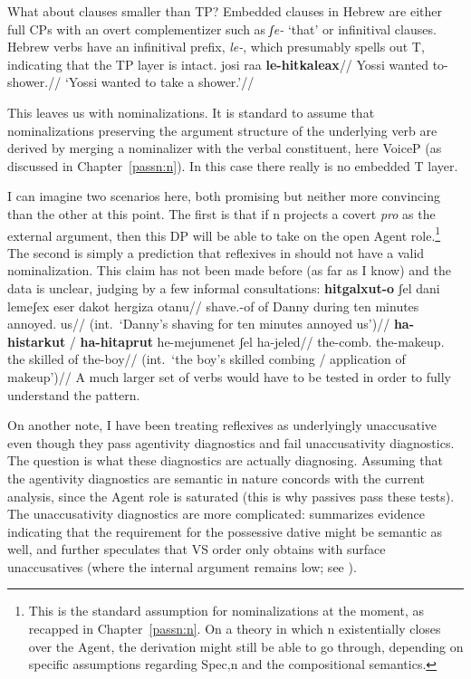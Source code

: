 What about clauses smaller than TP? Embedded clauses in Hebrew are either full CPs with an overt complementizer such as \emph{ʃe-} `that' or infinitival clauses. Hebrew verbs have an infinitival prefix, \emph{le-}, which presumably spells out T, indicating that the TP layer is intact.
\ex
	\begingl
	\gla josi ra{\ts}a \textbf{le-hitkaleax}//
	\glb Yossi wanted to-shower.//
	\glft `Yossi wanted to take a shower.'//
	\endgl
\xe

This leaves us with nominalizations. It is standard to assume that nominalizations preserving the argument structure of the underlying verb are derived by merging a nominalizer with the verbal constituent, here VoiceP (as discussed in Chapter~\ref{passn:n}). In this case there really is no embedded T layer.

I can imagine two scenarios here, both promising but neither more convincing than the other at this point. The first is that if n projects a covert \emph{pro} as the external argument, then this DP will be able to take on the open Agent role.\footnote{This is the standard assumption for nominalizations at the moment, as recapped in Chapter~\ref{passn:n}. On a theory in which n existentially closes over the Agent, the derivation might still be able to go through, depending on specific assumptions regarding Spec,n and the compositional semantics.} The second is simply a prediction that reflexives in {\thit} should not have a valid nominalization. This claim has not been made before (as far as I know) and the data is unclear, judging by a few informal consultations:
\pex
	\a \ljudge{\%} \begingl
		\gla \textbf{hitgalxut-o} ʃel dani lemeʃex eser dakot hergiza otanu//
		\glb shave.-of of Danny during ten minutes annoyed. us//
		\glft (int.~`Danny's shaving for ten minutes annoyed us')//
	\endgl
	\a \ljudge{\%} \begingl
		\gla \textbf{ha-histarkut} / \textbf{ha-hitaprut} he-mejumenet ʃel ha-jeled//
		\glb the-comb. {} the-makeup. the skilled of the-boy//
		\glft (int.~`the boy's skilled combing / application of makeup')//
	\endgl
\xe 
A much larger set of verbs would have to be tested in order to fully understand the pattern.

On another note, I have been treating reflexives as underlyingly unaccusative even though they pass agentivity diagnostics and fail unaccusativity diagnostics. The question is what these diagnostics are actually diagnosing. Assuming that the agentivity diagnostics are semantic in nature concords with the current analysis, since the Agent role is saturated (this is why passives pass these tests). The unaccusativity diagnostics are more complicated: \cite{kastner17gjgl} summarizes evidence indicating that the requirement for the possessive dative might be semantic as well, and further speculates that VS order only obtains with surface unaccusatives (where the internal argument remains low; see \citealt{unaccusativity95}).

